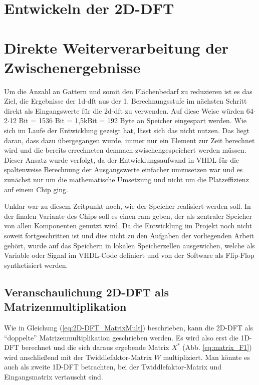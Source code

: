 \section{Entwickeln der 2D-DFT }

\section{Direkte Weiterverarbeitung der Zwischenergebnisse}
Um die Anzahl an Gattern und somit den Flächenbedarf zu reduzieren ist es das Ziel, die Ergebnisse der \gls{1d-dft} aus der 1. Berechnungsstufe im nächsten Schritt direkt als 
Eingangswerte für die \gls{2d-dft} zu verwenden. Auf diese Weise würden 64$\cdot$2$\cdot$12 Bit = 1536 Bit = 1,5kBit = 192 Byte an Speicher eingespart werden.
Wie sich im Laufe der Entwicklung gezeigt hat, lässt sich das nicht nutzen. Das liegt daran, dass dazu übergegangen wurde, immer nur ein Element zur Zeit berechnet wird und die 
bereits errechneten demnach zwischengespeichert werden müssen. Dieser Ansatz wurde verfolgt, da der Entwicklungsaufwand in VHDL für die spaltenweise Berechnung der Ausgangswerte 
einfacher umzusetzen war und es zunächst nur um die mathematische Umsetzung und nicht um die Platzeffizienz auf einem Chip ging.

Unklar war zu diesem Zeitpunkt noch, wie der Speicher realisiert werden soll. In der finalen Variante des Chips soll es einen \gls{ram} geben, der als zentraler
Speicher von allen Komponenten genutzt wird. Da die Entwicklung im Projekt noch nicht soweit fortgeschritten ist und dies nicht zu den Aufgaben der vorliegenden Arbeit gehört,
wurde auf das Speichern in lokalen Speicherzellen ausgewichen, welche als Variable oder Signal im VHDL-Code definiert und von der Software als Flip-Flop synthetisiert werden.



\subsection{Veranschaulichung 2D-DFT als Matrizenmultiplikation}
Wie in Gleichung (\ref{eq:2D-DFT_MatrixMult}) beschrieben, kann die 2D-DFT als ``doppelte'' Matrizenmultiplikation geschrieben werden.
Es wird also erst die 1D-DFT berechnet und die sich daraus ergebende Matrix $X^*$ (Abb. \ref{eq:matrix_F1}) wird anschließend mit der Twiddlefaktor-Matrix $W$ 
multipliziert. Man könnte es auch als zweite 1D-DFT betrachten, bei der Twiddlefaktor-Matrix und Eingangsmatrix vertauscht sind.

